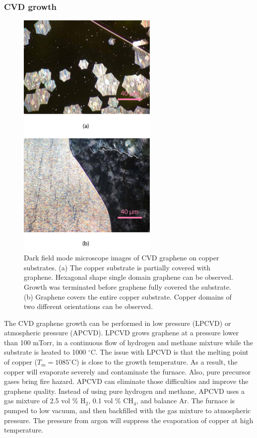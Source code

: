 \documentclass[pdflatex, sectionletters, 12pt]{pittetd}    %
\begin{document}
\subsubsection{CVD growth}

\begin{figure}[p]
	\centering
	\includegraphics[width=0.6\textwidth]{Drawing/CVDGraphene.pdf}
	\caption{Dark field mode microscope images of CVD graphene on copper substrates. (a) The copper substrate is partially covered with graphene. Hexagonal shape single domain graphene can be observed. Growth was terminated before graphene fully covered the substrate. (b) Graphene covers the entire copper substrate. Copper domains of two different orientations can be observed.}
	\label{FIG:CVDGraphene}
\end{figure}

The CVD graphene growth can be performed in low pressure (LPCVD) or atmospheric pressure (APCVD). LPCVD grows graphene at a pressure lower than 100 mTorr, in a continuous flow of hydrogen and methane mixture while the substrate is heated to 1000 $^{\circ}$C. The issue with LPCVD is that the melting point of copper ($T_m = 1085^{\circ}$C) is close to the growth temperature. As a result, the copper will evaporate severely and contaminate the furnace\cite{vlassiouk2013large}. Also, pure precursor gases bring fire hazard. APCVD can eliminate those difficulties and improve the graphene quality\cite{vlassiouk2013large, dhingra2015quadratic}. Instead of using pure hydrogen and methane, APCVD uses a gas mixture of 2.5 vol \% H$_2$, 0.1 vol \% CH$_4$, and balance Ar. The furnace is pumped to low vacuum, and then backfilled with the gas mixture to atmospheric pressure. The pressure from argon will suppress the evaporation of copper at high temperature. 
\end{document}

